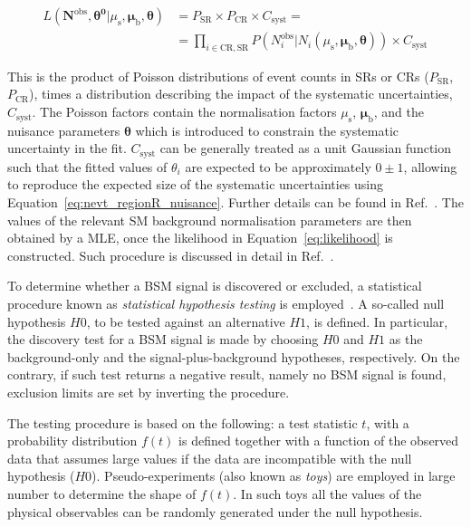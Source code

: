 			\begin{equation}
				\begin{split}
					L \left ( \bm{N}^{\mathrm{obs}}, \bm{\theta^0} | \mu_\mathrm{s}, \bm{\mu_{\mathrm{b}}, \theta} \right ) & = P_{\mathrm{SR}} \times P_{\mathrm{CR}} \times C_{\mathrm{syst}} = \\
					& = \prod_{i \in \mathrm{CR, SR}} P \left ( N_i^{\mathrm{obs}} | N_i \left( \mu_\mathrm{s}, \bm{\mu_{\mathrm{b}}, \theta} \right) \right ) \times C_{\mathrm{syst}}
				\end{split}
				\label{eq:likelihood}
			\end{equation}

			\noindent This is the product of Poisson distributions of event counts in \acp{SR} or \acp{CR} ($P_{\mathrm{SR}}$, $P_{\mathrm{CR}}$), times a distribution describing the impact of the systematic uncertainties, $C_{\mathrm{syst}}$. The Poisson factors contain the normalisation factors $\mu_\mathrm{s}$, $\bm{\mu_{\mathrm{b}}}$, and the nuisance parameters $\bm{\theta}$ which is introduced to constrain the systematic uncertainty in the fit. $C_{\mathrm{syst}}$ can be generally treated as a unit Gaussian function such that the fitted values of $\theta_i$ are expected to be approximately $0\pm1$, allowing to reproduce the expected size of the systematic uncertainties using Equation~\ref{eq:nevt_regionR_nuisance}. Further details can be found in Ref.~\cite{histfitter}. The values of the relevant \ac{SM} background normalisation parameters are then obtained by a \ac{MLE}, once the likelihood in Equation~\ref{eq:likelihood} is constructed. Such procedure is discussed in detail in Ref.~\cite{cowan1998statistical}.

			To determine whether a \ac{BSM} signal is discovered or excluded, a statistical procedure known as \emph{statistical hypothesis testing} is employed~\cite{Cowan2015}. A so-called null hypothesis $H0$, to be tested against an alternative $H1$, is defined. In particular, the discovery test for a \ac{BSM} signal is made by choosing $H0$ and $H1$ as the background-only and the signal-plus-background hypotheses, respectively. On the contrary, if such test returns a negative result, namely no \ac{BSM} signal is found, exclusion limits are set by inverting the procedure. 

			The testing procedure is based on the following: a test statistic $t$, with a probability distribution $f(t)$ is defined together with a function of the observed data that assumes large values if the data are incompatible with the null hypothesis ($H0$). Pseudo-experiments (also known as \emph{toys}) are employed in large number to determine the shape of $f(t)$. In such toys all the values of the physical observables can be randomly generated under the null hypothesis. %

